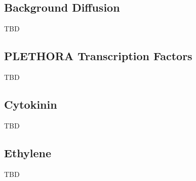 \subsection{Background Diffusion}

TBD

\subsection{PLETHORA Transcription Factors}

TBD

\subsection{Cytokinin}

TBD

\subsection{Ethylene}

TBD
